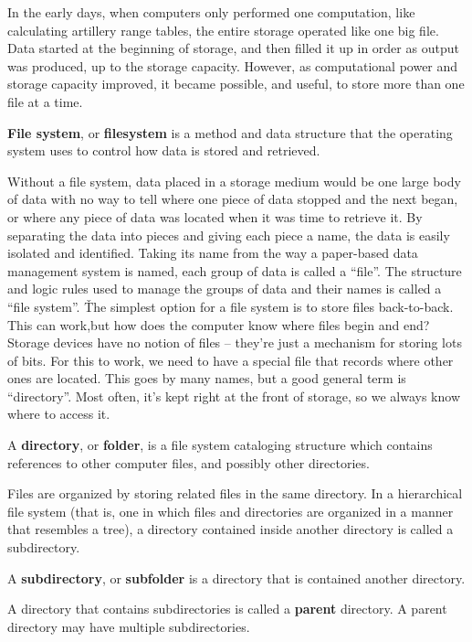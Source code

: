 In the early days, when computers only performed one computation, like calculating artillery range tables, the entire
storage operated like one big file. Data started at the beginning of storage, and then filled it up in order as
output was produced, up to the storage capacity. However, as computational power and storage capacity improved, it
became possible, and useful, to store more than one file at a time.

\textbf{File system}, or \textbf{filesystem} is a method and data structure that the operating system uses to control
how data is stored and retrieved.
\ed

Without a file system, data placed in a storage medium would be one large body of data with no way to tell where one
piece of data stopped and the next began, or where any piece of data was located when it was time to retrieve it. By
separating the data into pieces and giving each piece a name, the data is easily isolated and identified. Taking its
name from the way a paper-based data management system is named, each group of data is called a ``file''. The
structure and logic rules used to manage the groups of data and their names is called a ``file system''. \v

The simplest option for a file system is to store files back-to-back. This can work,but how does the computer know
where files begin and end? Storage devices have no notion of files – they're just a mechanism for storing lots of
bits. For this to work, we need to have a special file that records where other ones are located. This goes by many
names, but a good general term is ``directory''. Most often, it's kept right at the front of storage, so we always
know where to access it.

A \textbf{directory}, or \textbf{folder}, is a file system cataloging structure which contains references to other
computer files, and possibly other directories.
\ed

Files are organized by storing related files in the same directory. In a hierarchical file system (that is, one in
which files and directories are organized in a manner that resembles a tree), a directory contained inside another
directory is called a subdirectory.

A \textbf{subdirectory}, or \textbf{subfolder} is a directory that is contained another directory.
\ed

A directory that contains subdirectories is called a \textbf{parent} directory. A parent directory may have multiple
subdirectories.
\ed

